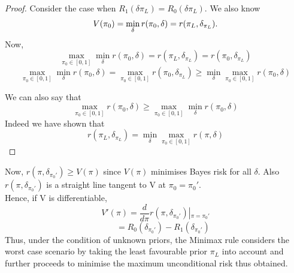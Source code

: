\documentclass[a4paper,english,12pt]{article}
\begin{document}
\begin{proof}
	Consider the case when $R_1(\delta{\pi_L})=R_0(\delta{\pi_L})$. We also know 
\begin{equation}
V({\pi _0}) = \mathop {\min }\limits_\delta  r({\pi _0},\delta ) = r({\pi _L},{\delta _{{\pi _L}}}).\\
\end{equation}
Now,\\
\begin{equation}
\mathop {\max }\limits_{{\pi _0} \in [0,1]} \mathop {\min }\limits_\delta  r({\pi _0},\delta ) = r({\pi _L},{\delta _{{\pi _L}}})=r({\pi _0},{\delta _{{\pi _L}}})
\end{equation}
\begin{equation}
\mathop {\max }\limits_{{\pi _0} \in [0,1]} \mathop {\min }\limits_\delta  r({\pi _0},\delta ) = \mathop {\max }\limits_{{\pi _0} \in [0,1]} r({\pi _0},{\delta _{{\pi _L}}}) \ge \mathop {\min }\limits_\delta  \mathop {\max }\limits_{{\pi _0} \in [0,1]} r({\pi _0},\delta )
\end{equation}

We can also say that
\begin{equation}
\mathop {\max }\limits_{{\pi _0} \in [0,1]} r({\pi _0},\delta ) \ge \mathop {\max }\limits_{{\pi _0} \in [0,1]} \mathop {\min }\limits_\delta  r({\pi _0},\delta )
\end{equation}
Indeed we have shown that 
\begin{equation}
r({\pi _L},{\delta _{{\pi _L}}}) = \mathop {\min }\limits_\delta  \mathop {\max }\limits_{{\pi _0} \in [0,1]} r(\pi ,\delta )
\end{equation}
\end{proof}
Now, $r(\pi,\delta_{\pi_0'})\geq V(\pi)$ since $V(\pi)$ minimises Bayes risk for all $\delta$. Also $r(\pi,\delta_{\pi_0'})$ is a straight line tangent to V at $\pi_0=\pi_0'$.\\
Hence, if V is differentiable,
\begin{equation}
V'(\pi ) = \frac{d}{{d\pi }}r(\pi ,{\delta _{{\pi _0'}}})\left| {_{\pi  = {\pi _0'}}} \right.
\end{equation}
\begin{equation}
~~~~~~~~= {R_0}({\delta _{{\pi _0'}}}) - {R_1}({\delta _{{\pi _0'}}})
\end{equation} 
Thus, under the condition of unknown priors, the Minimax rule considers the worst case scenario by taking the least favourable prior $\pi_L$ into account and further proceeds to minimise the maximum unconditional risk thus obtained.
\end{document}
